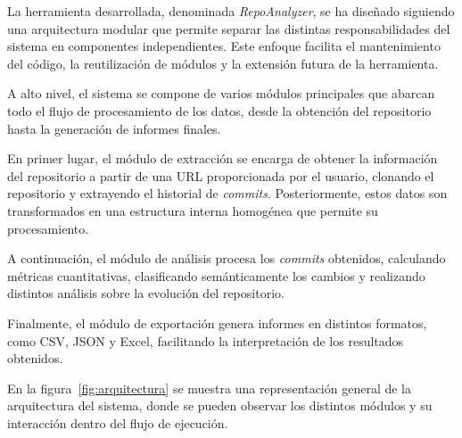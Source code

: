 \documentclass[a4paper, 12pt]{book}
\begin{document}
La herramienta desarrollada, denominada \emph{RepoAnalyzer}, se ha diseñado siguiendo una arquitectura modular que permite separar las distintas responsabilidades del sistema en componentes independientes. Este enfoque facilita el mantenimiento del código, la reutilización de módulos y la extensión futura de la herramienta.

A alto nivel, el sistema se compone de varios módulos principales que abarcan todo el flujo de procesamiento de los datos, desde la obtención del repositorio hasta la generación de informes finales.

En primer lugar, el módulo de extracción se encarga de obtener la información del repositorio a partir de una URL proporcionada por el usuario, clonando el repositorio y extrayendo el historial de \emph{commits}. Posteriormente, estos datos son transformados en una estructura interna homogénea que permite su procesamiento.

A continuación, el módulo de análisis procesa los \emph{commits} obtenidos, calculando métricas cuantitativas, clasificando semánticamente los cambios y realizando distintos análisis sobre la evolución del repositorio.

Finalmente, el módulo de exportación genera informes en distintos formatos, como CSV, JSON y Excel, facilitando la interpretación de los resultados obtenidos.

En la figura~\ref{fig:arquitectura} se muestra una representación general de la arquitectura del sistema, donde se pueden observar los distintos módulos y su interacción dentro del flujo de ejecución.
\end{document}
